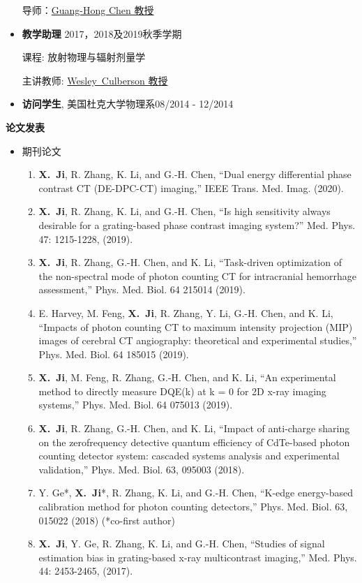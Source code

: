 \documentclass[letterpaper,11pt]{article}
\newcommand{\resheading}[1]{{\large \colorbox{mygrey}{\begin{minipage}{\textwidth}{\textbf{#1 \vphantom{p\^{E}}}}\end{minipage}}}}
\newcommand{\profchen}{\href{https://www.medphysics.wisc.edu/blog/staff/chen-guanghong/} {Guang-Hong Chen 教授}}
\newcommand{\profculberson}{\href{https://www.medphysics.wisc.edu/blog/staff/culberson-wesley/} {Wesley~Culberson 教授}}
\newcommand{\xji}{\textbf{X.~Ji}}
\begin{document}
\begin{CJK}{UTF8}{song}
\begin{itemize}
导师：\profchen
\item \textbf{教学助理} \cftdotfill{\cftdotsep} 2017，2018及2019秋季学期

课程: 放射物理与辐射剂量学

主讲教师: \profculberson
	 \item \textbf{访问学生}, 美国杜克大学物理系\cftdotfill{\cftdotsep}08/2014 - 12/2014
\end{itemize}
\resheading{论文发表}
\begin{itemize}
\item 期刊论文
\begin{enumerate}\justifying
\item \xji, R. Zhang, K. Li, and G.-H. Chen, ``Dual energy differential phase contrast CT (DE-DPC-CT) imaging,'' IEEE Trans. Med. Imag. (2020).
\item \xji, R. Zhang, K. Li, and G.-H. Chen, ``Is high sensitivity always desirable for a grating-based phase contrast imaging system?'' Med. Phys. 47: 1215-1228, (2019).
\item \xji, R. Zhang, G.-H. Chen, and K. Li, ``Task-driven optimization of the non-spectral mode of photon counting CT for intracranial hemorrhage assessment,'' Phys. Med. Biol. 64 215014 (2019).
\item E. Harvey, M. Feng, \xji, R. Zhang, Y. Li, G.-H. Chen, and K. Li, ``Impacts of photon counting CT to maximum intensity projection (MIP) images of cerebral CT angiography: theoretical and experimental studies,'' Phys. Med. Biol. 64 185015 (2019).
\item \xji, M. Feng, R. Zhang, G.-H. Chen, and K. Li, ``An experimental method to directly measure DQE(k) at k = 0 for 2D x-ray imaging systems,'' Phys. Med. Biol. 64 075013 (2019).
\item \xji, R. Zhang, G.-H. Chen, and K. Li, ``Impact of anti-charge sharing on the zerofrequency detective quantum efficiency of CdTe-based photon counting detector system: cascaded systems analysis and experimental validation,'' Phys. Med. Biol. 63, 095003 (2018).
\item Y. Ge*, \xji*, R. Zhang, K. Li, and G.-H. Chen, ``K-edge energy-based calibration method for photon counting detectors,'' Phys. Med. Biol. 63, 015022 (2018) (*co-first author)
\item \xji, Y. Ge, R. Zhang, K. Li, and G.-H. Chen, ``Studies of signal estimation bias in grating-based x-ray multicontrast imaging,'' Med. Phys. 44: 2453-2465, (2017).
\end{enumerate}


\end{itemize}
\end{CJK}
\end{document}
